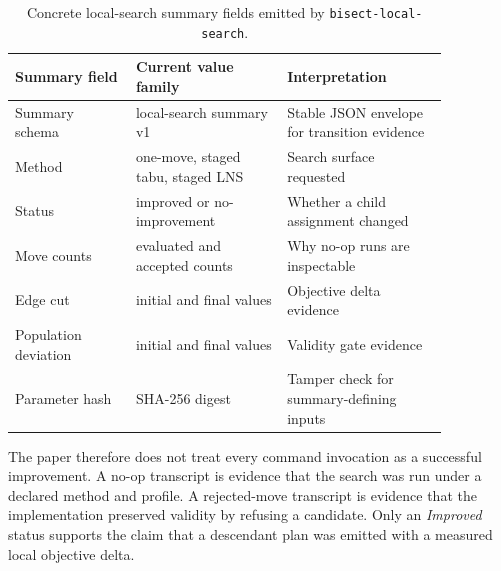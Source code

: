\begin{table}[htbp]
\centering
\small
\begin{tabular}{p{0.24\linewidth}p{0.30\linewidth}p{0.32\linewidth}}
\toprule
Summary field & Current value family & Interpretation \\
\midrule
Summary schema & local-search summary v1 & Stable JSON envelope for transition evidence \\
Method & one-move, staged tabu, staged LNS & Search surface requested \\
Status & improved or no-improvement & Whether a child assignment changed \\
Move counts & evaluated and accepted counts & Why no-op runs are inspectable \\
Edge cut & initial and final values & Objective delta evidence \\
Population deviation & initial and final values & Validity gate evidence \\
Parameter hash & SHA-256 digest & Tamper check for summary-defining inputs \\
\bottomrule
\end{tabular}
\caption{Concrete local-search summary fields emitted by \texttt{bisect-local-search}.}
\end{table}

The paper therefore does not treat every command invocation as a successful
improvement. A no-op transcript is evidence that the search was run under a
declared method and profile. A rejected-move transcript is evidence that the
implementation preserved validity by refusing a candidate. Only an
\emph{Improved} status supports the claim that a descendant plan was emitted
with a measured local objective delta.
